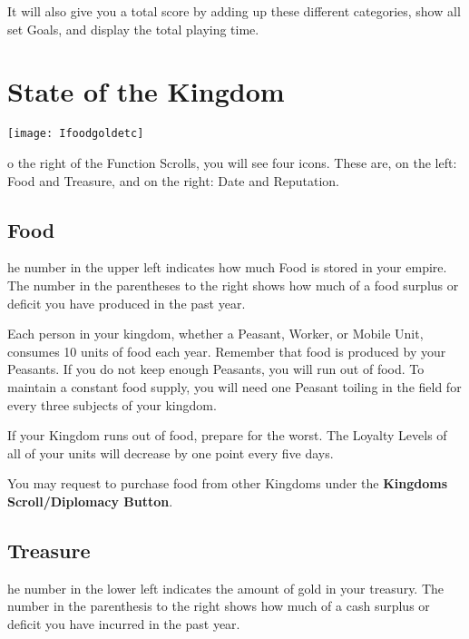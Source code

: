It will also give you a total score by adding up these different categories, show all set Goals, and display the total playing time.

\section{\textsf{State of the Kingdom}}


\begin{center}
    \texttt{[image: Ifoodgoldetc]} %
\end{center}

o the right of the Function Scrolls, you will see four icons. These are, on the left: Food and Treasure, and on the right: Date and Reputation.

\subsection{\textsf{Food}}


he number in the upper left indicates how much Food is stored in your empire. The number in the parentheses to the right shows how much of a food surplus or deficit you have produced in the past year.

Each person in your kingdom, whether a Peasant, Worker, or Mobile Unit, consumes 10 units of food each year. Remember that food is produced by your Peasants. If you do not keep enough Peasants, you will run out of food. To maintain a constant food supply, you will need one Peasant toiling in the field for every three subjects of your kingdom.

If your Kingdom runs out of food, prepare for the worst. The Loyalty Levels of all of your units will decrease by one point every five days.

You may request to purchase food from other Kingdoms under the \textbf{Kingdoms Scroll/Diplomacy Button}.

\subsection{\textsf{Treasure}}


he number in the lower left indicates the amount of gold in your treasury. The number in the parenthesis to the right shows how much of a cash surplus or deficit you have incurred in the past year.


